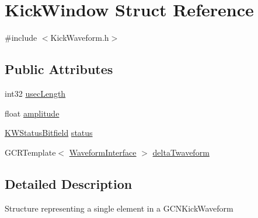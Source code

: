 \hypertarget{structKickWindow}{
\section{KickWindow Struct Reference}
\label{structKickWindow}
}


{\ttfamily \#include $<$KickWaveform.h$>$}

\subsection*{Public Attributes}
\begin{DoxyCompactItemize}
\item 
int32 \hyperlink{structKickWindow_ab7d5f6704ca1b06adcce2fbbd28fd0bd}{usecLength}
\item 
float \hyperlink{structKickWindow_a19abd0bca8e2503f7d6e2eac912071b6}{amplitude}
\item 
\hyperlink{structKWStatusBitfield}{KWStatusBitfield} \hyperlink{structKickWindow_ad9a832cfa230098138426e8cd7ac18b6}{status}
\item 
GCRTemplate$<$ \hyperlink{classWaveformInterface}{WaveformInterface} $>$ \hyperlink{structKickWindow_ac35a8cd53ad6c399fa7abfea65d5a0eb}{deltaTwaveform}
\end{DoxyCompactItemize}


\subsection{Detailed Description}
Structure representing a single element in a GCNKickWaveform 

